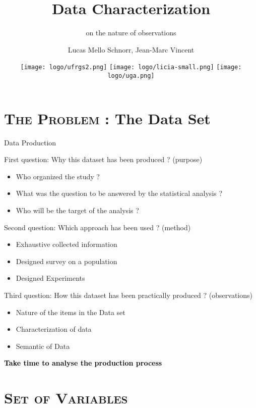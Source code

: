 \documentclass[xcolor=x11names,compress,8pt,
handout
]{beamer}
\title[Data Characterization] %
{Data Characterization}
\subtitle{on the nature of observations}
\author%
{		
Lucas Mello Schnorr, Jean-Marc Vincent
}
\institute[LICIA] %
{%
{\large INF/UFRGS\\
Porto Alegre, Brazil – October 2018}
}
\date[Porto Alegre 2018] %
{
\texttt{[image: logo/ufrgs2.png]}\hfill
\texttt{[image: logo/licia-small.png]}\hfill
\texttt{[image: logo/uga.png]}
}
\renewcommand{\(}{\begin{columns}}
\renewcommand{\)}{\end{columns}}
\newcommand{\<}[1]{\begin{column}{#1}}
\renewcommand{\>}{\end{column}}
\begin{document}
\begin{frame}
\titlepage
\end{frame}
\section[{\scshape Data Production}]{{\scshape The Problem} : The Data Set}

\begin{frame}{Data Production}
\begin{alertblock}{First question: Why  this dataset has been produced ? (purpose) }
\begin{itemize}
\item Who organized the study ?
\item What was the question to be answered by the statistical analysis ?
\item Who will be  the target of the  analysis ?
\end{itemize}
\end{alertblock}
\pause
\begin{alertblock}{Second question: Which approach has been used  ? (method) }
\begin{itemize}
\item Exhaustive collected information  
\item Designed survey on a population  
\item Designed Experiments
\end{itemize}
\end{alertblock}
\pause
\begin{alertblock}{Third question: How this dataset has been practically produced ? (observations) }
\begin{itemize}
\item Nature of the items in the Data set  
\item Characterization of data  
\item Semantic of Data
\end{itemize}
\end{alertblock}
\centerline{\colorbox{yellow!85}{\textcolor{black}{\textbf{\large Take time to analyse the production process}}}}
\end{frame}

\section[{\scshape Set of Variables}]{{\scshape Set of Variables} }
\end{document}
